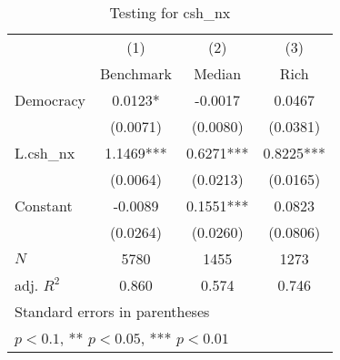 \begin{table}[htbp]\centering
\def\sym#1{\ifmmode^{#1}\else\(^{#1}\)\fi}
\caption{Testing for csh\_nx \label{tab:regression4}}
\begin{tabular}{l*{3}{c}}
\hline\hline
            &\multicolumn{1}{c}{(1)}&\multicolumn{1}{c}{(2)}&\multicolumn{1}{c}{(3)}\\
            &\multicolumn{1}{c}{Benchmark}&\multicolumn{1}{c}{Median}&\multicolumn{1}{c}{Rich}\\
\hline
Democracy   &      0.0123*  &     -0.0017   &      0.0467   \\
            &    (0.0071)   &    (0.0080)   &    (0.0381)   \\
[1em]
L.csh\_nx    &      1.1469***&      0.6271***&      0.8225***\\
            &    (0.0064)   &    (0.0213)   &    (0.0165)   \\
[1em]
Constant    &     -0.0089   &      0.1551***&      0.0823   \\
            &    (0.0264)   &    (0.0260)   &    (0.0806)   \\
\hline
\(N\)       &        5780   &        1455   &        1273   \\
adj. \(R^{2}\)&       0.860   &       0.574   &       0.746   \\
\hline\hline
\multicolumn{4}{l}{\footnotesize Standard errors in parentheses}\\
\multicolumn{4}{l}{\footnotesize * \(p<0.1\), ** \(p<0.05\), *** \(p<0.01\)}\\
\end{tabular}
\end{table}
